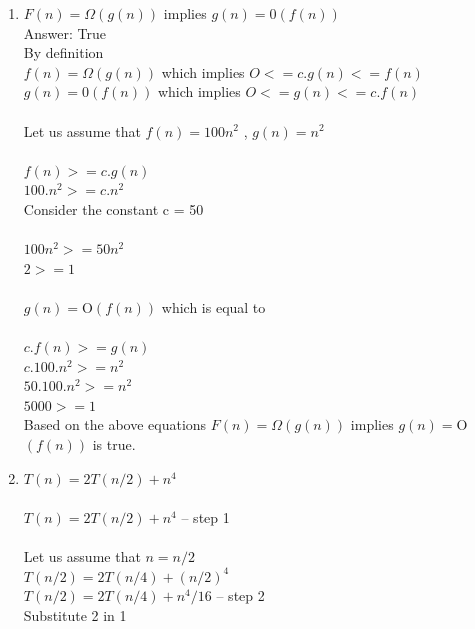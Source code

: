 \documentclass[11pt]{article}
\begin{document}
\begin{enumerate}

\itemsep 0.35in
 
\item

$F(n) = \Omega (g(n))$ implies $g(n) = $0$ (f(n))$ \\

Answer: True \\

By definition\\
$f(n) = \Omega (g(n))$ which implies  $O <= c.g(n) <= f(n)$ \\
$g(n) = $0$ (f(n))$ which implies $O <=  g(n) <= c.f(n)$ \\\\
Let us assume that $f(n) = 100n^2$ , $g(n) = n^2$ \\\\
$f(n) >=  c.g(n)$ \\
$100.n^2 >=  c.n^2$\\
Consider the constant c = 50 \\\\
$100n^2 >= 50n^2$ \\
$2 >= 1$ \\\\
$g(n) = $O$ (f(n))$ which is equal to \\\\ 
$c.f(n) >= g(n)$ \\ 
$c.100.n^2 >=  n^2$\\
$50.100.n^2 >= n^2$ \\
$5000 >= 1$ \\

Based on the above equations $F(n) = \Omega (g(n))$ implies $g(n) = $O$ (f(n))$ is true.
   
\item

$T(n) = 2T(n/2)+n^4$ \\ \\

$T(n) = 2T(n/2)+n^4$ -- step 1\\ \\

Let us assume that $n=n/2$ \\

$T(n/2) = 2T(n/4)+(n/2)^4$ \\
$T(n/2) = 2T(n/4)+n^4/16$ -- step 2\\

Substitute 2 in 1 \\


\end{enumerate}
\end{document}
